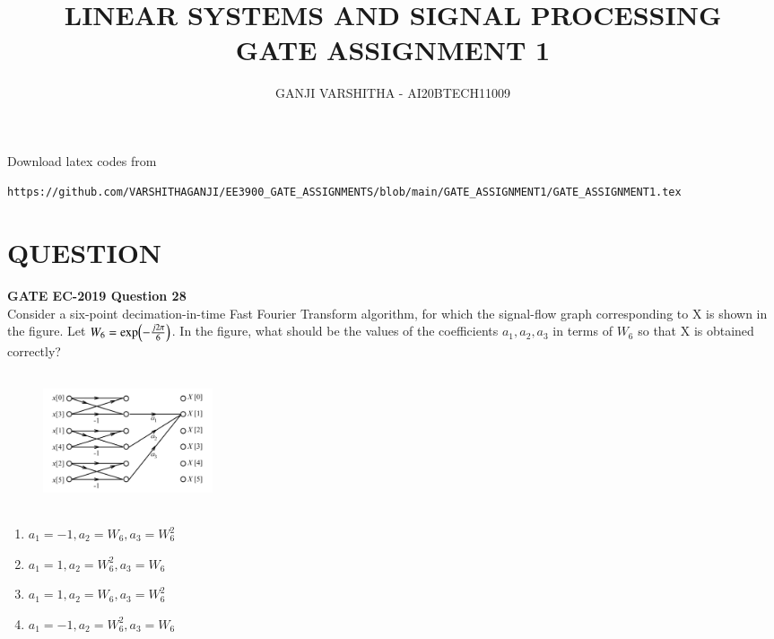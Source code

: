 \documentclass[journal,12pt,twocolumn]{IEEEtran}
\begin{document}
\let\vec\mathbf
\renewcommand{\thefigure}{\theproblem}
\def\putbox#1#2#3{\makebox[0in][l]{\makebox[#1][l]{}\raisebox{\baselineskip}[0in][0in]{\raisebox{#2}[0in][0in]{#3}}}}
     \def\rightbox#1{\makebox[0in][r]{#1}}
     \def\centbox#1{\makebox[0in]{#1}}
     \def\topbox#1{\raisebox{-\baselineskip}[0in][0in]{#1}}
     \def\midbox#1{\raisebox{-0.5\baselineskip}[0in][0in]{#1}}
\vspace{3cm}
\title{\textbf{LINEAR SYSTEMS AND SIGNAL PROCESSING \\ GATE ASSIGNMENT 1}}
\author{GANJI VARSHITHA - AI20BTECH11009}
\maketitle
\newpage
\bigskip
\renewcommand{\thefigure}{\arabic{figure}}
\renewcommand{\thetable}{\arabic{table}}
Download latex codes from 
%
\begin{lstlisting}
https://github.com/VARSHITHAGANJI/EE3900_GATE_ASSIGNMENTS/blob/main/GATE_ASSIGNMENT1/GATE_ASSIGNMENT1.tex
\end{lstlisting}
\section*{QUESTION}
\textbf{GATE EC-2019 Question 28}
\\
Consider a six-point decimation-in-time Fast Fourier Transform  algorithm, for which the signal-flow graph corresponding to X is shown in the figure. Let $W_{6}=\text{exp\ensuremath{\left(-\frac{j2\pi}{6}\right)}}$. In the figure, what should be the values of the coefficients $a_{1}, a_{2}, a_{3}$ in terms of $W_{6}$ so that X is obtained correctly?
\begin{figure}[h]
\includegraphics[width=5cm, height=4cm]{gateq1}
\centering
\end{figure}
\begin{enumerate}
   \item  $a_{1}=-1, a_{2}=W_{6}, a_{3}=W_{6}^{2}$ 
   \item  $a_{1}=1, a_{2}=W_{6}^{2}, a_{3}=W_{6}$ 
   \item  $a_{1}=1, a_{2}=W_{6}, a_{3}=W_{6}^{2}$ 
   \item  $a_{1}=-1, a_{2}=W_{6}^{2}, a_{3}=W_{6}$ 
   
\end{enumerate}
\end{document}
